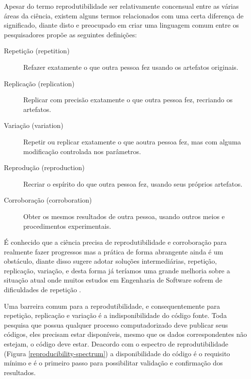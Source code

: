 Apesar do termo reprodutibilidade ser relativamente concensual entre as várias
áreas da ciência, existem alguns termos relacionados com uma certa diferença
de significado, diante disto e preocupado em criar uma linguagem comum entre
os pesquisadores  propõe as seguintes definições:

\begin{description}

  \item[Repetição (repetition)]
  Refazer exatamente o que outra pessoa fez usando os artefatos originais.

  \item[Replicação (replication)]
  Replicar com precisão exatamente o que outra pessoa fez, recriando os
  artefatos.

  \item[Variação (variation)]
  Repetir ou replicar exatamente o que aoutra pessoa fez, mas com alguma
  modificação controlada nos parâmetros.

  \item[Reprodução (reproduction)]
  Recriar o espírito do que outra pessoa fez, usando seus próprios artefatos.

  \item[Corroboração (corroboration)]
  Obter os mesmos resultados de outra pessoa, usando outros meios e
  procedimentos experimentais.

\end{description}

É conhecido que a ciência precisa de reprodutibilidade e corroboração para
realmente fazer progressos mas a prática de forma abrangente ainda é um
obstáculo, diante disso  sugere adotar soluções
intermediárias, repetição, replicação, variação, e desta forma já teríamos uma
grande melhoria sobre a situação atual onde muitos estudos em Engenharia de
Software sofrem de dificuldades de repetição \cite{Tang2016}.

Uma barreira comum para a reprodutibilidade, e consequentemente para repetição,
replicação e variação é a indisponibilidade do código fonte.  Toda pesquisa que
possua qualquer processo computadorizado deve publicar seus códigos, eles
precisam estar disponíveis, mesmo que os dados correspondentes não estejam, o
código deve estar. Deacordo com o espectro de reprodutibilidade (Figura
\ref{reproducibility-spectrum}) a disponibilidade do código é o requisito
mínimo e é o primeiro passo para possibilitar validação e confirmação dos
resultados.

